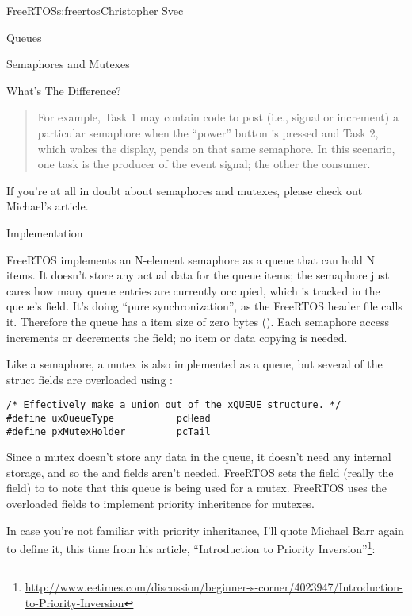 \begin{aosachapter}{FreeRTOS}{s:freertos}{Christopher Svec}
\begin{aosasect1}{Queues}
\begin{aosasect2}{Semaphores and Mutexes}
\begin{aosasect3}{What's The Difference?}
\begin{quotation}
\noindent For example, Task 1 may contain code to post (i.e., signal or increment) a 
particular semaphore when the ``power'' button is pressed and Task 2, which wakes the 
display, pends on that same semaphore. In this scenario, one task is the producer of 
the event signal; the other the consumer.
\end{quotation}

\noindent If you're at all in doubt about semaphores and mutexes, please check
out Michael's article.

\end{aosasect3}

\begin{aosasect3}{Implementation}

FreeRTOS implements an N-element semaphore as a queue that can hold N
items. It doesn't store any actual data for the queue items; the
semaphore just cares how many queue entries are currently occupied,
which is tracked in the queue's  field.  It's
doing ``pure synchronization'', as the FreeRTOS header file
 calls it.  Therefore the queue has a item size of zero
bytes ().  Each semaphore access increments or
decrements the  field; no item or data copying
is needed.

Like a semaphore, a mutex is also implemented as a queue, but several
of the  struct fields are overloaded using
:

\begin{verbatim}
/* Effectively make a union out of the xQUEUE structure. */
#define uxQueueType           pcHead
#define pxMutexHolder         pcTail
\end{verbatim}

Since a mutex doesn't store any data in the queue, it doesn't need any
internal storage, and so the  and  fields
aren't needed.  FreeRTOS sets the  field (really the
 field) to  to note that this queue is being used for a
mutex.  FreeRTOS uses the overloaded  fields to implement
priority inheritence for mutexes.

In case you're not familiar with priority inheritance, I'll quote
Michael Barr again to define it, this time from his article,
``Introduction to Priority
Inversion''\footnote{\url{http://www.eetimes.com/discussion/beginner-s-corner/4023947/Introduction-to-Priority-Inversion}}:


\end{aosasect3}
\end{aosasect2}
\end{aosasect1}
\end{aosachapter}
